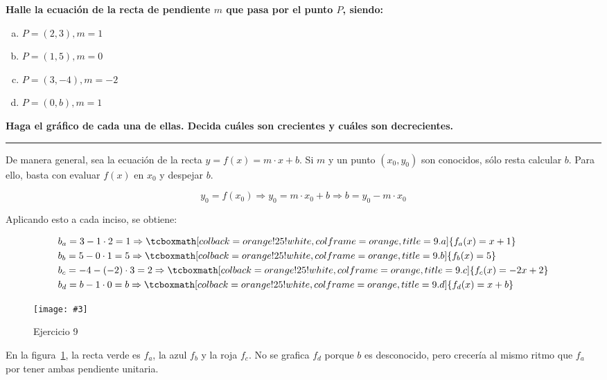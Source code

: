 \documentclass{article}
\newcommand{\hresult}[2]{\tcboxmath[colback=orange!25!white,colframe=orange, title=#1] {#2} }
\newcommand{\figurex}[4]{\begin{figure}[ht] \caption{#1} \texttt{[image: \#3]} \centering \label{#4}\end{figure}}
\begin{document}
\textbf{Halle la ecuación de la recta de pendiente $m$ que pasa por el punto $P$, siendo:}

\begin{enumerate}[(a)]

\bfseries

\item $P = (2, 3), m = 1$

\item $P = (1, 5), m = 0$

\item $P = (3, -4), m = -2$

\item $P = (0, b), m = 1$

\end{enumerate}

\textbf{Haga el gráfico de cada una de ellas. Decida cuáles son crecientes y cuáles son decrecientes.}
\vspace{1em}
\hrule
\vspace{1em}
De manera general, sea la ecuación de la recta $y = f(x) = m \cdot x + b$. Si $m$ y un punto $(x_0, y_0)$ son conocidos, sólo resta calcular $b$. Para ello, basta con evaluar $f(x)$ en $x_0$ y despejar $b$.

\begin{equation}
y_0 = f(x_0) \Rightarrow y_0 = m \cdot x_0 + b \Rightarrow b = y_0 - m \cdot x_0
\end{equation}

Aplicando esto a cada inciso, se obtiene:

\begin{subequations}
\begin{align}
& b_a = 3 - 1 \cdot 2 = 1 \Rightarrow \hresult{9.a}{ f_a(x) = x + 1 } \\
& b_b = 5 - 0 \cdot 1 = 5 \Rightarrow \hresult{9.b}{ f_b(x) = 5 } \\
& b_c = -4 - (-2) \cdot 3 = 2 \Rightarrow \hresult{9.c}{ f_c(x) = -2x + 2 } \\
& b_d = b - 1 \cdot 0 = b \Rightarrow \hresult{9.d}{ f_d(x) = x + b }
\end{align}
\end{subequations}

\newpage

\figurex{Ejercicio 9}{3}{../img/guide_01/ex_09.png}{fig:9}

En la figura~\ref{fig:9}, la recta verde es $f_a$, la azul $f_b$ y la roja $f_c$. No se grafica $f_d$ porque $b$ es desconocido, pero crecería al mismo ritmo que $f_a$ por tener ambas pendiente unitaria.
\end{document}
